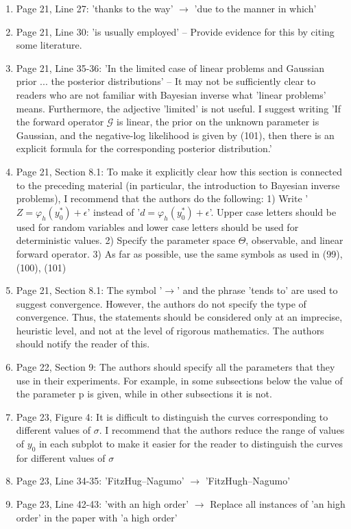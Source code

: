 \documentclass{article}
\begin{document}
\begin{enumerate}[label=(\arabic*)]
		\item Page 21, Line 27: 'thanks to the way' $\to$ 'due to the manner in which'
		\item Page 21, Line 30: 'is usually employed' -- Provide evidence for this by citing some literature.
		\item Page 21, Line 35-36: 'In the limited case of linear problems and Gaussian prior ... the posterior distributions' -- It may not be sufficiently clear to readers who are not familiar with Bayesian inverse what 'linear problems' means. Furthermore, the adjective 'limited' is not useful. I suggest writing 'If the forward operator $\mathcal{G}$ is linear, the prior on the unknown parameter is Gaussian, and the negative-log likelihood is given by (101), then there is an explicit formula for the corresponding posterior distribution.'
		\item Page 21, Section 8.1: To make it explicitly clear how this section is connected to the preceding material (in particular, the introduction to Bayesian inverse problems), I recommend that the authors do the following: 1) Write '$Z=\varphi_h(y_0^\ast)+\epsilon$' instead of '$d= \varphi_h(y_0^\ast)+\epsilon$'. Upper case letters should be used for random variables and lower case letters should be used for deterministic values. 2) Specify the parameter space $\Theta$, observable, and linear forward operator. 3) As far as possible, use the same symbols as used in (99), (100), (101)
		\item Page 21, Section 8.1: The symbol '$\to$' and the phrase 'tends to' are used to suggest convergence. However, the authors do not specify the type of convergence. Thus, the statements should be considered only at an imprecise, heuristic level, and not at the level of rigorous mathematics. The authors should notify the reader of this.
		\item Page 22, Section 9: The authors should specify all the parameters that they use in their experiments. For example, in some subsections below the value of the parameter p is given, while in other subsections it is not. 
		\item Page 23, Figure 4: It is difficult to distinguish the curves corresponding to different values of $\sigma$. I recommend that the authors reduce the range of values of $y_0$ in each subplot to make it easier for the reader to distinguish the curves for different values of $\sigma$
		\item Page 23, Line 34-35: 'FitzHug--Nagumo' $\to$ 'FitzHugh--Nagumo'
		\item Page 23, Line 42-43: 'with an high order' $\to$ Replace all instances of 'an high order' in the paper with 'a high order'

\end{enumerate}
\end{document}
